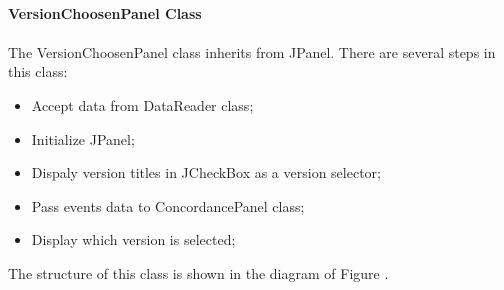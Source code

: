 \paragraph{VersionChoosenPanel Class}
\paragraph[]{}The VersionChoosenPanel class inherits from JPanel. There are several steps in this class:
\begin{itemize}
	\item \textbf{}Accept data from DataReader class;
	\item \textbf{}Initialize JPanel;
	\item \textbf{}Dispaly version titles in JCheckBox as a version selector;
	\item \textbf{}Pass events data to ConcordancePanel class;
	\item \textbf{}Display which version is selected;
\end{itemize}  
The structure of this class is shown in the diagram of Figure \label{versionChoosenPanel}.


